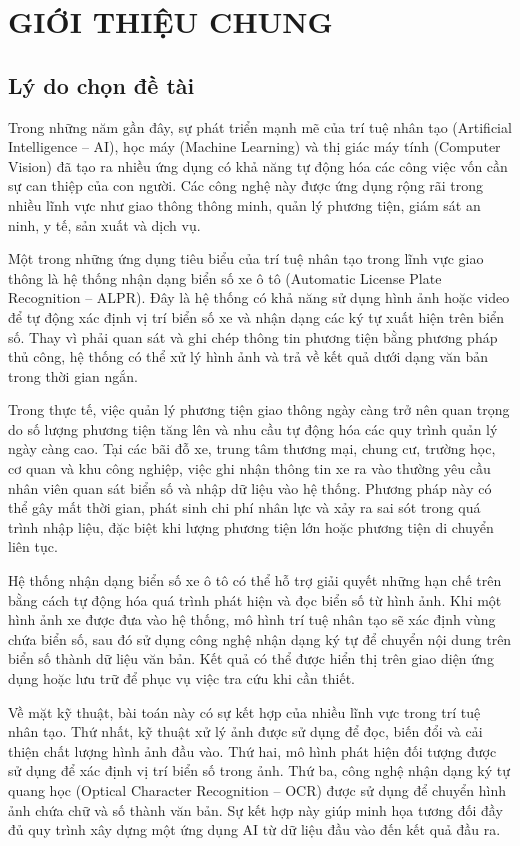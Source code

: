 \chapter{GIỚI THIỆU CHUNG}

\section{Lý do chọn đề tài}

Trong những năm gần đây, sự phát triển mạnh mẽ của trí tuệ nhân tạo (Artificial Intelligence – AI), học máy (Machine Learning) và thị giác máy tính (Computer Vision) đã tạo ra nhiều ứng dụng có khả năng tự động hóa các công việc vốn cần sự can thiệp của con người. Các công nghệ này được ứng dụng rộng rãi trong nhiều lĩnh vực như giao thông thông minh, quản lý phương tiện, giám sát an ninh, y tế, sản xuất và dịch vụ.

Một trong những ứng dụng tiêu biểu của trí tuệ nhân tạo trong lĩnh vực giao thông là hệ thống nhận dạng biển số xe ô tô (Automatic License Plate Recognition – ALPR). Đây là hệ thống có khả năng sử dụng hình ảnh hoặc video để tự động xác định vị trí biển số xe và nhận dạng các ký tự xuất hiện trên biển số. Thay vì phải quan sát và ghi chép thông tin phương tiện bằng phương pháp thủ công, hệ thống có thể xử lý hình ảnh và trả về kết quả dưới dạng văn bản trong thời gian ngắn.

Trong thực tế, việc quản lý phương tiện giao thông ngày càng trở nên quan trọng do số lượng phương tiện tăng lên và nhu cầu tự động hóa các quy trình quản lý ngày càng cao. Tại các bãi đỗ xe, trung tâm thương mại, chung cư, trường học, cơ quan và khu công nghiệp, việc ghi nhận thông tin xe ra vào thường yêu cầu nhân viên quan sát biển số và nhập dữ liệu vào hệ thống. Phương pháp này có thể gây mất thời gian, phát sinh chi phí nhân lực và xảy ra sai sót trong quá trình nhập liệu, đặc biệt khi lượng phương tiện lớn hoặc phương tiện di chuyển liên tục.

Hệ thống nhận dạng biển số xe ô tô có thể hỗ trợ giải quyết những hạn chế trên bằng cách tự động hóa quá trình phát hiện và đọc biển số từ hình ảnh. Khi một hình ảnh xe được đưa vào hệ thống, mô hình trí tuệ nhân tạo sẽ xác định vùng chứa biển số, sau đó sử dụng công nghệ nhận dạng ký tự để chuyển nội dung trên biển số thành dữ liệu văn bản. Kết quả có thể được hiển thị trên giao diện ứng dụng hoặc lưu trữ để phục vụ việc tra cứu khi cần thiết.

Về mặt kỹ thuật, bài toán này có sự kết hợp của nhiều lĩnh vực trong trí tuệ nhân tạo. Thứ nhất, kỹ thuật xử lý ảnh được sử dụng để đọc, biến đổi và cải thiện chất lượng hình ảnh đầu vào. Thứ hai, mô hình phát hiện đối tượng được sử dụng để xác định vị trí biển số trong ảnh. Thứ ba, công nghệ nhận dạng ký tự quang học (Optical Character Recognition – OCR) được sử dụng để chuyển hình ảnh chứa chữ và số thành văn bản. Sự kết hợp này giúp minh họa tương đối đầy đủ quy trình xây dựng một ứng dụng AI từ dữ liệu đầu vào đến kết quả đầu ra.

